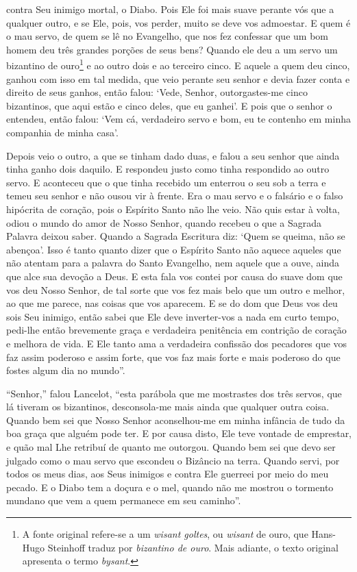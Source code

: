 contra Seu inimigo mortal, o Diabo. Pois Ele foi mais suave perante vós que a
qualquer outro, e se Ele, pois, vos perder, muito se deve vos admoestar. E quem
é o mau servo, de quem se lê no Evangelho, que nos fez confessar que um bom
homem deu três grandes porções de seus bens? Quando ele deu a um servo um
bizantino de ouro\footnote{ A fonte original refere-se a um \textit{wisant
goltes}, ou \textit{wisant} de ouro, que Hans-Hugo Steinhoff traduz por
\textit{bizantino de ouro}. Mais adiante, o texto original apresenta o termo
\textit{bysant}.} e ao outro dois e ao terceiro cinco. E aquele a
quem deu cinco, ganhou com isso em tal medida, que veio perante seu senhor e
devia fazer conta e direito de seus ganhos, então falou: ‘Vede, Senhor,
outorgastes-me cinco bizantinos, que aqui estão e cinco deles, que eu ganhei’.
E pois que o senhor o entendeu, então falou: ‘Vem cá, verdadeiro servo e bom,
eu te contenho em minha companhia de minha casa’. 

Depois veio o outro, a que se tinham dado duas, e falou a seu senhor que ainda
tinha ganho dois daquilo. E respondeu justo como tinha respondido ao outro
servo. E aconteceu que o que tinha recebido um enterrou o seu sob a terra e
temeu seu senhor e não ousou vir à frente. Era o mau servo e o falsário e o
falso hipócrita de coração, pois o Espírito Santo não lhe veio. Não quis estar
à volta, odiou o mundo do amor de Nosso Senhor, quando recebeu o que a Sagrada
Palavra deixou saber. Quando a Sagrada Escritura diz: ‘Quem se queima, não se
abençoa’. Isso é tanto quanto dizer que o Espírito Santo não aquece aqueles que
não atentam para a palavra do Santo Evangelho, nem aquele que a ouve, ainda que
alce sua devoção a Deus. E esta fala vos contei por causa do suave dom que vos
deu Nosso Senhor, de tal sorte que vos fez mais belo que um outro e melhor, ao
que me parece, nas coisas que vos aparecem. E se do dom que Deus vos deu sois
Seu inimigo, então sabei que Ele deve inverter-vos a nada em curto tempo,
pedi-lhe então brevemente graça e verdadeira penitência em contrição de coração
e melhora de vida. E Ele tanto ama a verdadeira confissão dos pecadores que
vos faz assim poderoso e assim forte, que vos faz mais forte e mais
poderoso do que fostes algum dia no mundo”.  

“Senhor,” falou Lancelot, “esta parábola que me mostrastes dos três servos, que
lá tiveram os bizantinos, desconsola-me mais ainda que qualquer outra coisa.
Quando bem sei que Nosso Senhor aconselhou-me em minha infância de tudo da boa
graça que alguém pode ter. E por causa disto, Ele teve vontade de emprestar, e
quão mal Lhe retribuí de quanto me outorgou. Quando bem sei que devo ser
julgado como o mau servo que escondeu o Bizâncio na terra. Quando servi, por
todos os meus dias, aos Seus inimigos e contra Ele guerreei por meio do meu
pecado. E o Diabo tem a doçura e o mel, quando não me mostrou o tormento
mundano que vem a quem permanece em seu caminho”. 

